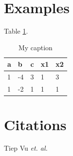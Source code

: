 \documentclass{article}
\begin{document}
\section{Examples} %
\label{sec:examples}
Table \ref{tab:tb1}.
\begin{table}[h]
\centering
\caption{My caption}
\label{tab:tb1}
\begin{tabular}{|l|l|l|l|l|}
\hline
a & b  & c & x1 & x2 \\ \hline
1 & -4 & 3 & 1  & 3  \\ \hline
1 & -2 & 1 & 1  & 1  \\ \hline
\end{tabular}
\end{table}

\section{Citations} %
\label{sec:citations}
Tiep Vu \textit{et. al.} \cite{vu2015dfdl,vu2016histopathological}
\end{document}
